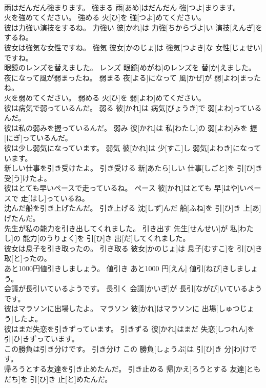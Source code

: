 \documentclass[8pt]{extreport}
\begin{document}
\begin{CJK}{UTF8}{min}
\\	雨はだんだん強まります。	強まる	雨[あめ]はだんだん 強[つよ]まります。	
\\	火を強めてください。	強める	火[ひ]を 強[つよ]めてください。	
\\	彼は力強い演技をするね。	力強い	彼[かれ]は 力強[ちからづよ]い 演技[えんぎ]をするね。	
\\	彼女は強気な女性ですね。	強気	彼女[かのじょ]は 強気[つよき]な 女性[じょせい]ですね。	
\\	眼鏡のレンズを替えました。	レンズ	眼鏡[めがね]のレンズを 替[か]えました。	
\\	夜になって風が弱まったね。	弱まる	夜[よる]になって 風[かぜ]が 弱[よわ]まったね。	
\\	火を弱めてください。	弱める	火[ひ]を 弱[よわ]めてください。	
\\	彼は病気で弱っているんだ。	弱る	彼[かれ]は 病気[びょうき]で 弱[よわ]っているんだ。	
\\	彼は私の弱みを握っているんだ。	弱み	彼[かれ]は 私[わたし]の 弱[よわ]みを 握[にぎ]っているんだ。	
\\	彼は少し弱気になっています。	弱気	彼[かれ]は 少[すこ]し 弱気[よわき]になっています。	
\\	新しい仕事を引き受けたよ。	引き受ける	新[あたら]しい 仕事[しごと]を 引[ひ]き 受[う]けたよ。	
\\	彼はとても早いペースで走っているね。	ペース	彼[かれ]はとても 早[はや]いペースで 走[はし]っているね。	
\\	沈んだ船を引き上げたんだ。	引き上げる	沈[しず]んだ 船[ふね]を 引[ひ]き 上[あ]げたんだ。	
\\	先生が私の能力を引き出してくれました。	引き出す	先生[せんせい]が 私[わたし]の 能力[のうりょく]を 引[ひ]き 出[だ]してくれました。	
\\	彼女は息子を引き取ったの。	引き取る	彼女[かのじょ]は 息子[むすこ]を 引[ひ]き 取[と]ったの。	
\\	あと1000円値引きしましょう。	値引き	あと1000 円[えん] 値引[ねび]きしましょう。	
\\	会議が長引いているようです。	長引く	会議[かいぎ]が 長引[ながび]いているようです。	
\\	彼はマラソンに出場したよ。	マラソン	彼[かれ]はマラソンに 出場[しゅつじょう]したよ。	
\\	彼はまだ失恋を引きずっています。	引きずる	彼[かれ]はまだ 失恋[しつれん]を 引[ひ]きずっています。	
\\	この勝負は引き分けです。	引き分け	この 勝負[しょうぶ]は 引[ひ]き 分[わ]けです。	
\\	帰ろうとする友達を引き止めたんだ。	引き止める	帰[かえ]ろうとする 友達[ともだち]を 引[ひ]き 止[と]めたんだ。	

\end{CJK}
\end{document}
